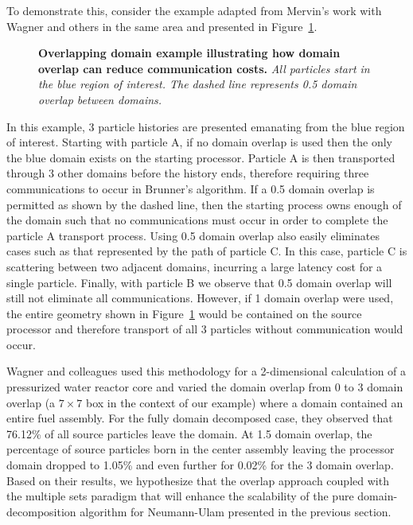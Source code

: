 To demonstrate this, consider the example adapted from Mervin's work
with Wagner and others in the same area \cite{mervin_variance_2012}
and presented in Figure~\ref{fig:msod_example}.
\begin{figure}[t!]
  \begin{center}
    \scalebox{1.5}{
       }
  \end{center}
  \caption{\textbf{Overlapping domain example illustrating how domain
      overlap can reduce communication costs.}
    \textit{All particles start in the blue region of interest. The
      dashed line represents 0.5 domain overlap between domains.}}
  \label{fig:msod_example}
\end{figure}
In this example, 3 particle histories are presented emanating from the
blue region of interest. Starting with particle A, if no domain
overlap is used then the only the blue domain exists on the starting
processor. Particle A is then transported through 3 other domains
before the history ends, therefore requiring three communications to
occur in Brunner's algorithm. If a 0.5 domain overlap is permitted as
shown by the dashed line, then the starting process owns enough of the
domain such that no communications must occur in order to complete the
particle A transport process. Using 0.5 domain overlap also easily
eliminates cases such as that represented by the path of particle
C. In this case, particle C is scattering between two adjacent
domains, incurring a large latency cost for a single
particle. Finally, with particle B we observe that 0.5 domain overlap
will still not eliminate all communications. However, if 1 domain
overlap were used, the entire geometry shown in
Figure~\ref{fig:msod_example} would be contained on the source
processor and therefore transport of all 3 particles without
communication would occur.

Wagner and colleagues used this methodology for a 2-dimensional
calculation of a pressurized water reactor core and varied the domain
overlap from 0 to 3 domain overlap (a $7 \times 7$ box in the context
of our example) where a domain contained an entire fuel assembly. For
the fully domain decomposed case, they observed that 76.12\% of all
source particles leave the domain. At 1.5 domain overlap, the
percentage of source particles born in the center assembly leaving the
processor domain dropped to 1.05\% and even further for 0.02\% for the
3 domain overlap. Based on their results, we hypothesize that the
overlap approach coupled with the multiple sets paradigm that will
enhance the scalability of the pure domain-decomposition algorithm for
Neumann-Ulam presented in the previous section.

